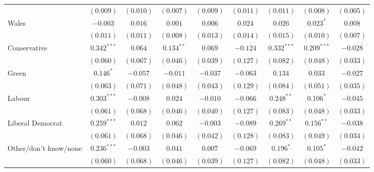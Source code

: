 \documentclass[12pt, letter]{article}
\begin{document}
\begin{table}[H]
\begin{center}
{\begin{tabular}{l c c c c c c c c }
                                 & $(0.009)$      & $(0.010)$      & $(0.007)$      & $(0.009)$      & $(0.011)$      & $(0.011)$      & $(0.008)$      & $(0.005)$      \\
Wales                            & $-0.003$       & $0.016$        & $0.001$        & $0.006$        & $0.024$        & $0.026$        & $0.023^{*}$    & $0.008$        \\
                                 & $(0.011)$      & $(0.011)$      & $(0.008)$      & $(0.013)$      & $(0.014)$      & $(0.015)$      & $(0.010)$      & $(0.007)$      \\
Conservative                     & $0.342^{***}$  & $0.064$        & $0.134^{**}$   & $0.069$        & $-0.124$       & $0.332^{***}$  & $0.209^{***}$  & $-0.028$       \\
                                 & $(0.060)$      & $(0.067)$      & $(0.046)$      & $(0.039)$      & $(0.127)$      & $(0.082)$      & $(0.048)$      & $(0.033)$      \\
Green                            & $0.146^{*}$    & $-0.057$       & $-0.011$       & $-0.037$       & $-0.063$       & $0.134$        & $0.033$        & $-0.027$       \\
                                 & $(0.063)$      & $(0.071)$      & $(0.048)$      & $(0.043)$      & $(0.129)$      & $(0.084)$      & $(0.051)$      & $(0.035)$      \\
Labour                           & $0.303^{***}$  & $-0.008$       & $0.024$        & $-0.010$       & $-0.066$       & $0.248^{**}$   & $0.106^{*}$    & $-0.045$       \\
                                 & $(0.061)$      & $(0.068)$      & $(0.046)$      & $(0.040)$      & $(0.127)$      & $(0.083)$      & $(0.048)$      & $(0.033)$      \\
Liberal Democrat                 & $0.259^{***}$  & $0.012$        & $0.062$        & $-0.003$       & $-0.089$       & $0.269^{**}$   & $0.156^{**}$   & $-0.038$       \\
                                 & $(0.061)$      & $(0.068)$      & $(0.046)$      & $(0.042)$      & $(0.128)$      & $(0.083)$      & $(0.049)$      & $(0.034)$      \\
Other/don't know/none            & $0.236^{***}$  & $-0.003$       & $0.041$        & $0.007$        & $-0.069$       & $0.196^{*}$    & $0.105^{*}$    & $-0.042$       \\
                                 & $(0.060)$      & $(0.068)$      & $(0.046)$      & $(0.039)$      & $(0.127)$      & $(0.082)$      & $(0.048)$      & $(0.033)$      \\

\end{tabular}}
\end{center}
\end{table}
\end{document}

